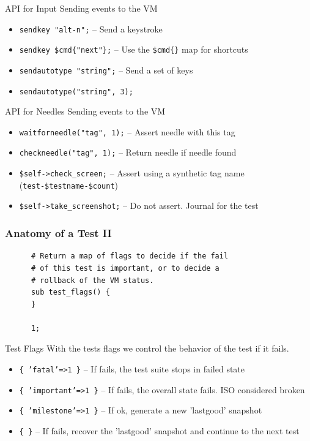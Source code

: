 \documentclass{beamer}
\begin{document}
\begin{frame}{API for Input}
  Sending events to the VM
  \begin{itemize}
  \item \texttt{sendkey "alt-n";} -- Send a keystroke
  \item \texttt{sendkey \$cmd\{"next"\};} -- Use the \texttt{\$cmd\{\}} map for shortcuts
  \item \texttt{sendautotype "string";} -- Send a set of keys
  \item \texttt{sendautotype("string", 3);}
  \end{itemize}
\end{frame}

\begin{frame}{API for Needles}
  Sending events to the VM
  \begin{itemize}
  \item \texttt{waitforneedle("tag", 1);} -- Assert needle with this tag
  \item \texttt{checkneedle("tag", 1);} -- Return needle if needle found
  \item \texttt{\$self->check\_screen;} -- Assert using a synthetic tag name (\texttt{test-\$testname-\$count})
  \item \texttt{\$self->take\_screenshot;} -- Do not assert. Journal for the test
  \end{itemize}
\end{frame}

\begin{frame}[fragile]
  \frametitle{Anatomy of a Test II}
    \lstset{style=myperl}
    \begin{lstlisting}
      # Return a map of flags to decide if the fail
      # of this test is important, or to decide a
      # rollback of the VM status.
      sub test_flags() {
      }

      1;
    \end{lstlisting}
\end{frame}

\begin{frame}{Test Flags}
  With the tests flags we control the behavior of the test if it fails.
  \begin{itemize}
  \item \texttt{\{ 'fatal'=>1 \}} -- If fails, the test suite stops in failed state
  \item \texttt{\{ 'important'=>1 \}} -- If fails, the overall state fails. ISO considered broken
  \item \texttt{\{ 'milestone'=>1 \}} -- If ok, generate a new 'lastgood' snapshot
  \item \texttt{\{ \}} -- If fails, recover the 'lastgood' snapshot and continue to the next test
  \end{itemize}
\end{frame}
\end{document}
